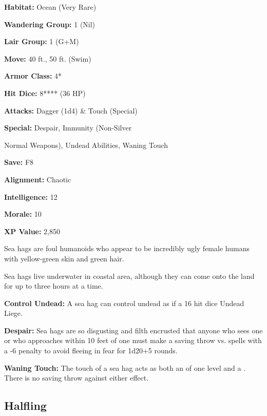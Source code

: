 \begin{multicols*}{2}
{\textbf{Habitat:} Ocean (Very Rare)

\textbf{Wandering Group:} 1 (Nil)

\textbf{Lair Group:} 1 (G+M)

\textbf{Move:} 40 ft., 50 ft. (Swim)

\textbf{Armor Class:} 4*

\textbf{Hit Dice:} 8**** (36 HP)

\textbf{Attacks:} Dagger (1d4) \& Touch (Special)

\textbf{Special:} Despair, Immunity (Non-Silver 

Normal Weapons), Undead Abilities, Waning Touch

\textbf{Save:} F8

\textbf{Alignment:} Chaotic

\textbf{Intelligence:} 12

\textbf{Morale:} 10

\textbf{XP Value:} 2,850}

Sea hags are foul humanoids who appear to be incredibly ugly female humans with yellow-green skin and green hair.

Sea hags live underwater in coastal area, although they can come onto the land for up to three hours at a time.

\textbf{Control Undead:} A sea hag can control undead as if a 16 hit dice Undead Liege.

\textbf{Despair:} Sea hags are so disgusting and filth encrusted that anyone who sees one or who approaches within 10 feet of one must make a saving throw vs. spells with a -6 penalty to avoid fleeing in fear for 1d20+5 rounds.

\textbf{Waning Touch:} The touch of a sea hag acts as both an  of one level and a . There is no saving throw against either effect.

\subsection{Halfling}
\end{multicols*}
